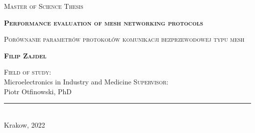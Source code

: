 \begin{titlepage}
\begin{center}
\vspace*{0.5cm}
{\large\scshape Master of Science Thesis}\\
\vspace*{1.0cm}

{\large{\bfseries\scshape Performance evaluation of mesh networking protocols}}\\
\vspace*{0.8cm}

{\large{\scshape Porównanie parametrów protokołów komunikacji bezprzewodowej typu mesh}}\\
\vspace*{1.0cm}

{\large\bfseries\scshape Filip Zajdel}\\
\vfill

\vspace*{0.9cm}

\normalsize{\scshape Field of study:}\\
Microelectronics in Industry and Medicine
\vfill
\vspace*{0.3cm}
\normalsize{\scshape Supervisor:}\\
Piotr Otfinowski, PhD
\vfill

\rule{.7\textwidth}{1mm}\\
\vspace*{1mm}
{\large Krakow, 2022}
\end{center}
\newpage
\end{titlepage}